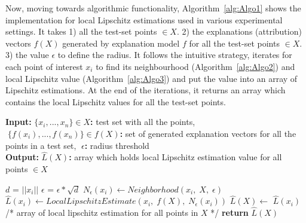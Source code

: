 \documentclass[english]{tktltiki2}
\theoremstyle{definition}
\newtheorem{definition}[thm]{Definition}
\theoremstyle{remark}
\newcommand{\multicommentsymbolstart}{/*}
\newcommand{\multicommentsymbolend}{*/}
\newcommand{\MultiLineComment}[2][\algorithmicindent]{\Statex \hspace{#1}\multicommentsymbolstart{} #2 \multicommentsymbolend{}}
\newcommand{\onespace}{\;}
\begin{document}

Now, moving towards algorithmic functionality, Algorithm~\ref{alg:Algo1} shows the implementation for local Lipschitz estimations used in various experimental settings. It takes 1) all the test-set points $ \in X$. 2) the explanations (attribution) vectors $f(X)$ generated by explanation model $f$  for all the test-set points $\in X$. 3) the value $\epsilon$ to define the radius.  It follows the intuitive strategy, iterates for each point of interest $x_i$ to find its neighbourhood (Algorithm~\ref{alg:Algo2}) and local Lipschitz value (Algorithm~\ref{alg:Algo3}) and put the value into an array of Lipschitz estimations. At the end of the iterations, it returns an array which contains the local Lipschitz values for all the test-set points.
\begin{algorithm}[H]
	\caption{$LipschitzEstimations(X,\onespace f(X),\onespace \epsilon)$}
	\label{alg:Algo1}
	\hspace*{\algorithmicindent} \textbf{Input}\textbf{:} $\{x_i,...,x_n\} \in X$\textbf{:} test set with all the points, $\onespace \{f(x_i),...,f(x_n)\} \in f(X)$\textbf{:} set of generated explanation vectors for all the points in a test set, $\onespace \epsilon$\textbf{:} radius threshold \\
	\hspace*{\algorithmicindent} \textbf{Output}\textbf{:} $\hat{L}(X)$\textbf{:} array which holds local Lipschitz estimation value for all points $\in X$ 
	\begin{algorithmic}[1]
		\State $d$ = $||x_i||$
		\State $\epsilon$ = $\epsilon * \sqrt{d}$ 
		\State $N_{\epsilon}(x_i) \gets Neighborhood(x_i,\; X,\; \epsilon)$
		\State $\hat{L}(x_{i}) \gets LocalLipschitzEstimate(x_i,\; f(X),\; N_\epsilon(x_i))$
		\State $\hat{L}(X) \gets$ $\hat{L}(x_i)$
		\EndFor
		\MultiLineComment[0\dimexpr\algorithmicindent]{array of local lipschitz estimation for all points in $X$}
		\State \textbf{return} $\hat{L}(X)$
	\end{algorithmic}
\end{algorithm}
\end{document}
